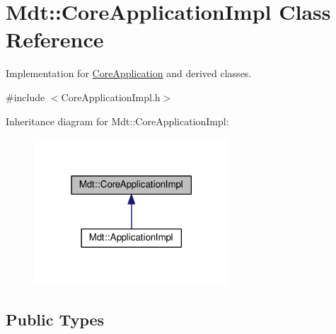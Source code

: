 \hypertarget{class_mdt_1_1_core_application_impl}{}\section{Mdt\+:\+:Core\+Application\+Impl Class Reference}
\label{class_mdt_1_1_core_application_impl}


Implementation for \hyperlink{class_mdt_1_1_core_application}{Core\+Application} and derived classes.  




{\ttfamily \#include $<$Core\+Application\+Impl.\+h$>$}



Inheritance diagram for Mdt\+:\+:Core\+Application\+Impl\+:\nopagebreak
\begin{figure}[H]
\begin{center}
\leavevmode
\includegraphics[width=207pt]{class_mdt_1_1_core_application_impl__inherit__graph}
\end{center}
\end{figure}
\subsection*{Public Types}
